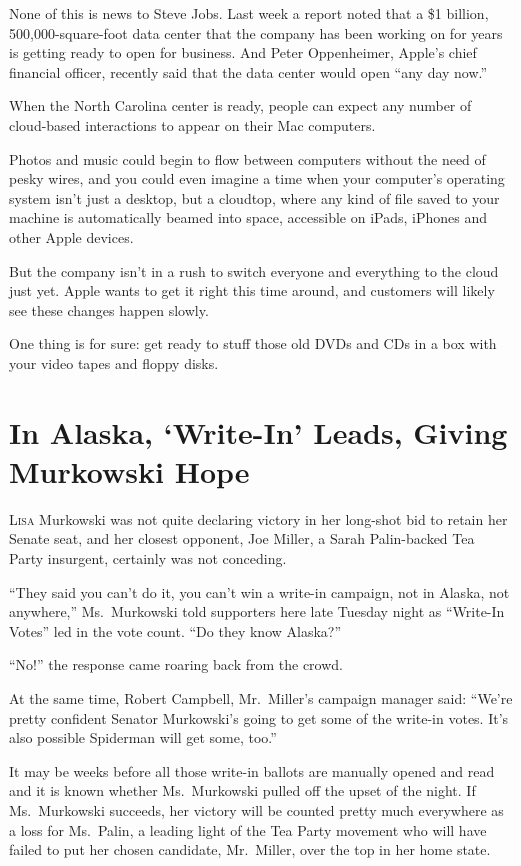﻿\documentclass[12pt]{article}
\begin{document}
None of this is news to Steve Jobs. Last week a report noted that a \$1 billion, 500,000-square-foot
data center that the company has been working on for years is getting ready to open for business.
And Peter Oppenheimer, Apple's chief financial officer, recently said that the data center would
open ``any day now.''

When the North Carolina center is ready, people can expect any number of cloud-based interactions to
appear on their Mac computers.

Photos and music could begin to flow between computers without the need of pesky wires, and you
could even imagine a time when your computer's operating system isn't just a desktop, but a
cloudtop, where any kind of file saved to your machine is automatically beamed into space,
accessible on iPads, iPhones and other Apple devices.

But the company isn't in a rush to switch everyone and everything to the cloud just yet. Apple wants
to get it right this time around, and customers will likely see these changes happen slowly.

One thing is for sure: get ready to stuff those old DVDs and CDs in a box with your video tapes and
floppy disks.

\section{In Alaska, `Write-In' Leads, Giving Murkowski Hope}

\lettrine{L}{isa} Murkowski was not quite declaring victory in her long-shot
bid to retain her Senate seat, and her closest opponent, Joe Miller, a Sarah Palin-backed Tea Party
insurgent, certainly was not conceding.

``They said you can't do it, you can't win a write-in campaign, not in Alaska, not anywhere,''
Ms.~Murkowski told supporters here late Tuesday night as ``Write-In Votes'' led in the vote count.
``Do they know Alaska?''

``No!'' the response came roaring back from the crowd.

At the same time, Robert Campbell, Mr.~Miller's campaign manager said: ``We're pretty confident
Senator Murkowski's going to get some of the write-in votes. It's also possible Spiderman will get
some, too.''

It may be weeks before all those write-in ballots are manually opened and read and it is known
whether Ms.~Murkowski pulled off the upset of the night. If Ms.~Murkowski succeeds, her victory will
be counted pretty much everywhere as a loss for Ms.~Palin, a leading light of the Tea Party movement
who will have failed to put her chosen candidate, Mr.~Miller, over the top in her home state.
\end{document}
